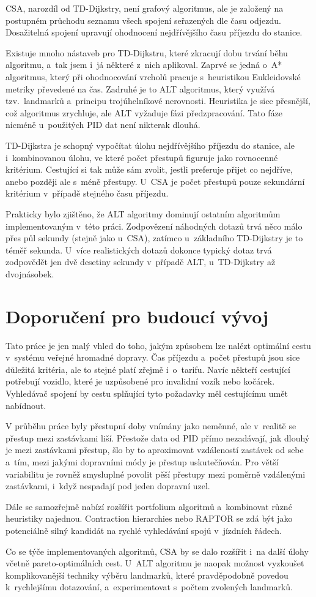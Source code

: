CSA, narozdíl od TD-Dijkstry, není grafový algoritmus, ale je založený na postupném průchodu seznamu všech spojení seřazených dle času odjezdu. Dosažitelná spojení upravují ohodnocení nejdřívějšího času příjezdu do stanice.

Existuje mnoho nástaveb pro TD-Dijkstru, které zkracují dobu trvání běhu algoritmu, a~tak jsem i~já některé z~nich aplikoval. Zaprvé se jedná o~A* algoritmus, který při ohodnocování vrcholů pracuje s~heuristikou Eukleidovské metriky převedené na čas. Zadruhé je to ALT algoritmus, který využívá tzv.~landmarků a~principu trojúhelníkové nerovnosti. Heuristika je sice přesnější, což algoritmus zrychluje, ale ALT vyžaduje fázi předzpracování. Tato fáze nicméně u~použitých PID dat není nikterak dlouhá. 

TD-Dijkstra je schopný vypočítat úlohu nejdřívějšího příjezdu do stanice, ale i~kombinovanou úlohu, ve které počet přestupů figuruje jako rovnocenné kritérium. Cestující si tak může sám zvolit, jestli preferuje přijet co nejdříve, anebo později ale s~méně přestupy. U~CSA je počet přestupů pouze sekundární kritérium v~případě stejného času příjezdu.

Prakticky bylo zjištěno, že ALT algoritmy dominují ostatním algoritmům implementovaným v~této práci. Zodpovězení náhodných dotazů trvá něco málo přes půl sekundy (stejně jako u~CSA), zatímco u~základního TD-Dijkstry je to téměř sekunda. U~více realistických dotazů dokonce typický dotaz trvá zodpovědět jen dvě desetiny sekundy v~případě ALT, u~TD-Dijkstry až dvojnásobek.

\section{Doporučení pro budoucí vývoj}
Tato práce je jen malý vhled do toho, jakým způsobem lze nalézt optimální cestu v~systému veřejné hromadné dopravy. Čas příjezdu a~počet přestupů jsou sice důležitá kritéria, ale to stejné platí zřejmě i~o~tarifu. Navíc někteří cestující potřebují vozidlo, které je uzpůsobené pro invalidní vozík nebo kočárek. Vyhledávač spojení by cestu splňující tyto požadavky měl cestujícímu umět nabídnout.

V průběhu práce byly přestupní doby vnímány jako neměnné, ale v~realitě se přestup mezi zastávkami liší. Přestože data od PID přímo nezadávají, jak dlouhý je mezi zastávkami přestup, šlo by to aproximovat vzdáleností zastávek od sebe a~tím, mezi jakými dopravními módy je přestup uskutečňován. Pro větší variabilitu je rovněž smysluplné povolit pěší přestupy mezi poměrně vzdálenými zastávkami, i~když nespadají pod jeden dopravní uzel.

Dále se samozřejmě nabízí rozšířit portfolium algoritmů a~kombinovat různé heuristiky najednou. Contraction hierarchies nebo RAPTOR se zdá být jako potenciálně silný kandidát na rychlé vyhledávání spojů v~jízdních řádech. 

Co se týče implementovaných algoritmů, CSA by se dalo rozšířit i~na další úlohy včetně pareto-optimálních cest. U~ALT algoritmu je naopak možnost vyzkoušet komplikovanější techniky výběru landmarků, které pravděpodobně povedou k~rychlejšímu dotazování, a~experimentovat s~počtem zvolených landmarků.

